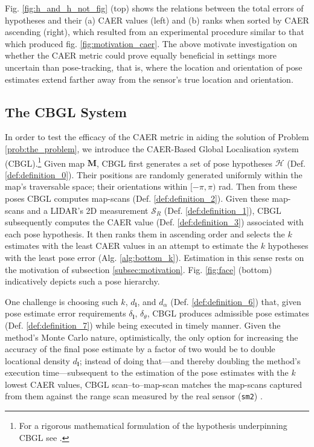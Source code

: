 Fig. \ref{fig:h_and_h_not_fig} (top) shows the relations between the total
errors of hypotheses and their (a) CAER values (left) and (b) ranks when sorted
by CAER ascending (right), which resulted from an experimental procedure
similar to that which produced fig.  \ref{fig:motivation_caer}.  The above
motivate investigation on whether the CAER metric could prove equally
beneficial in settings more uncertain than pose-tracking, that is, where the
location and orientation of pose estimates extend farther away from the
sensor's true location and orientation.


\subsection{The CBGL System}

In order to test the efficacy of the CAER metric in aiding the solution of
Problem \ref{prob:the_problem}, we introduce the CAER-Based Global Localisation
system (CBGL).\footnote{For a rigorous mathematical formulation of the
hypothesis underpinning CBGL see \cite{cbglarxiv}.} Given map $\bm{M}$, CBGL
first generates a set of pose hypotheses $\mathcal{H}$ (Def.
\ref{def:definition_0}). Their positions are randomly generated
uniformly within the map's traversable space; their orientations within
$[-\pi,\pi)$ rad. Then from these poses CBGL computes map-scans (Def.
\ref{def:definition_2}). Given these map-scans and a LIDAR's 2D measurement
$\mathcal{S}_R$ (Def. \ref{def:definition_1}), CBGL subsequently computes the
CAER value (Def. \ref{def:definition_3}) associated with each pose hypothesis.
It then ranks them in ascending order and selects the $k$ estimates with the
least CAER values in an attempt to estimate the $k$ hypotheses with the least
pose error (Alg. \ref{alg:bottom_k}). Estimation in this sense rests on the
motivation of subsection \ref{subsec:motivation}. Fig. \ref{fig:face} (bottom)
indicatively depicts such a pose hierarchy.

One challenge is choosing such $k$, $d_{\bm{l}}$, and $d_\alpha$ (Def.
\ref{def:definition_6}) that, given pose estimate error requirements
$\delta_{\bm{l}}$, $\delta_{\theta}$, CBGL produces admissible pose estimates
(Def. \ref{def:definition_7}) while being executed in timely manner.  Given the
method's Monte Carlo nature, optimistically, the only option for increasing the
accuracy of the final pose estimate by a factor of two would be to double
locational density $d_{\bm{l}}$; instead of doing that---and thereby doubling
the method's execution time---subsequent to the estimation of the pose
estimates with the $k$ lowest CAER values, CBGL scan--to--map-scan matches
the map-scans captured from them against the range scan measured by the real
sensor (\texttt{sm2}) \cite{Vasiljevic2016c,Filotheou2023a}.

